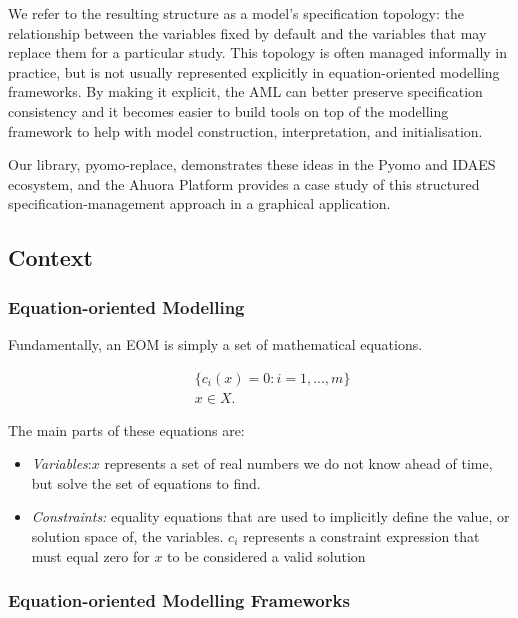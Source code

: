 We refer to the resulting structure as a model's specification topology:
the relationship between the variables fixed by default and the
variables that may replace them for a particular study. This topology is
often managed informally in practice, but is not usually represented
explicitly in equation-oriented modelling frameworks. By making it
explicit, the AML can better preserve specification consistency and it
becomes easier to build tools on top of the modelling framework to help
with model construction, interpretation, and initialisation.

Our library, pyomo-replace, demonstrates these ideas in the Pyomo and
IDAES \citep{miller2018next} ecosystem, and the Ahuora Platform
provides a case study of this structured specification-management
approach in a graphical application.

\hypertarget{literature-review}{%
\subsection{Context}\label{literature-review}}

\hypertarget{equation-oriented-modelling}{%
\subsubsection{Equation-oriented
Modelling}\label{equation-oriented-modelling}}

Fundamentally, an EOM is simply a set of mathematical equations.

\[
\begin{aligned}
\quad 
& \{c_i(x) = 0 : i = 1,...,m\} \\
& x \in X.
\end{aligned}
\]

The main parts of these equations are:

\begin{itemize}
\tightlist
\item
  \emph{Variables}:\(x\) represents a set of real numbers we do not know
  ahead of time, but solve the set of equations to find.
\item
  \emph{Constraints:} equality equations that are used to implicitly
  define the value, or solution space of, the variables. \(c_i\)
  represents a constraint expression that must equal zero for \(x\) to
  be considered a valid solution
\end{itemize}

\hypertarget{equation-oriented-modelling-frameworks}{%
\subsubsection{Equation-oriented Modelling
Frameworks}\label{equation-oriented-modelling-frameworks}}

